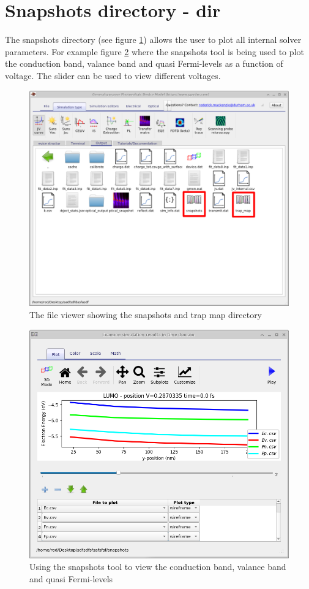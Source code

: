 \section{Snapshots directory - dir}
\label{sec:snapshots}
The snapshots directory (see figure \ref{fig:fileviewer}) allows the user to plot all internal solver parameters.  For example figure \ref{fig:snapshots} where the snapshots tool is being used to plot the conduction band, valance band and quasi Fermi-levels as a function of voltage.  The slider can be used to view different voltages.

\begin{figure}[H]
\centering
\includegraphics[width=\textwidth,height=0.7\textwidth]{./images/snapshots.png}
\caption{The file viewer showing the snapshots and trap map directory}
\label{fig:fileviewer}
\end{figure}

\begin{figure}[H]
\centering
\includegraphics[width=\textwidth,height=0.7\textwidth]{./images/snapshot_viewer.png}
\caption{Using the snapshots tool to view the conduction band, valance band and quasi Fermi-levels}
\label{fig:snapshots}
\end{figure}

